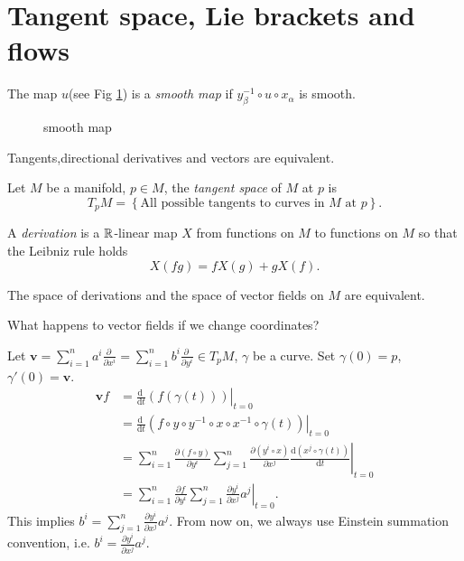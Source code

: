 \section{Tangent space, Lie brackets and flows}
\begin{definition}
  The map $u$(see Fig \ref{fig:smooth-map}) is a \textit{smooth map} if $y^{-1}_\beta\circ u\circ x_\alpha$ is smooth.
\begin{figure}[ht]
    \centering
    \caption{smooth map}
    \label{fig:smooth-map}
\end{figure}
\end{definition}
Tangents,directional derivatives and vectors are equivalent.
\begin{definition}
  Let $M$ be a manifold, $p\in M$, the  \textit{tangent space} of $M$ at $p$ is 
  \[
  T_p M=\left\{\text{All possible tangents to curves in }M \text{ at }p\right\}.
  \] 
\end{definition}
\begin{definition}
  A \textit{derivation}  is a $\mathbb{R}$-linear map $X$ from functions on $M$ to functions on $M$ so that the Leibniz rule holds
  \[
    X(fg)=fX(g)+gX(f).
  \] 
  
\end{definition}
The space of derivations and the space of vector fields on  $M$ are equivalent.
\begin{question}
  What happens to vector fields if we change coordinates?
\end{question}
Let $\mathbf{v}=\sum_{i=1}^{n} a^i \frac{\partial ~}{\partial x^i}=\sum_{i=1}^n b^i \frac{\partial~}{\partial y^i}\in T_pM$, $\gamma$ be a curve. Set $\gamma(0)=p$, $\gamma'(0)=\mathbf{v}$. 
\begin{align*}
  \mathbf{v}f&=\left. \frac{\mathrm{d} ~}{\mathrm{d}t}\left( f\left( \gamma(t) \right)  \right)\right|_{t=0}\\
  &= \left. \frac{\mathrm{d}~}{\mathrm{d}t}\left( f\circ y\circ y^{-1}\circ x \circ x^{-1}\circ \gamma(t) \right)\right|_{t=0}\\
  &=\left . \sum_{i=1}^{n} \frac{\partial (f\circ y)}{\partial y^i}\sum_{j=1}^n \frac{\partial (y^i\circ x)}{\partial x^j} \frac{\mathrm{d} (x^j\circ \gamma(t))}{\mathrm{d}t}\right|_{t=0}\\
    &=\left. \sum_{i=1}^{n} \frac{\partial f}{\partial y^i}\sum_{j=1}^{n} \frac{\partial y^i}{\partial x^j}a^j\right|_{t=0}
.\end{align*}
This implies $b^i=\sum_{j=1}^{n} \frac{\partial y^i}{\partial x^j}a^j$.
From now on, we always use Einstein summation convention, i.e. $b^i=\frac{\partial y^i}{\partial x^j}a^j$.

